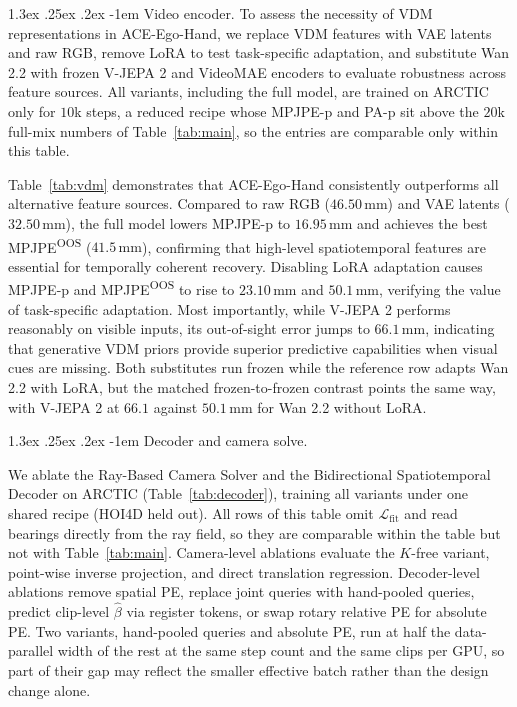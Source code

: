 \documentclass[10pt,twocolumn,letterpaper]{article}
\makeatletter
\renewcommand\paragraph{\@startsection{paragraph}{4}{\z@}%
  {1.3ex \@plus .25ex \@minus .2ex}%
  {-1em}%
  {\normalfont\normalsize\bfseries}}
\newcommand{\method}{ACE-Ego-Hand} %
\makeatother
\begin{document}
\paragraph{Video encoder.}
To assess the necessity of VDM representations in \method{}, we replace VDM features with VAE latents and raw RGB, remove LoRA to test task-specific adaptation, and substitute Wan 2.2 with frozen V-JEPA 2 and VideoMAE encoders to evaluate robustness across feature sources. All variants, including the full model, are trained on ARCTIC only for $10$k steps, a reduced recipe whose MPJPE-p and PA-p sit above the $20$k full-mix numbers of Table~\ref{tab:main}, so the entries are comparable only within this table.

Table~\ref{tab:vdm} demonstrates that \method{} consistently outperforms all alternative feature sources. Compared to raw RGB ($46.50\,\mathrm{mm}$) and VAE latents ($32.50\,\mathrm{mm}$), the full model lowers MPJPE-p to $16.95\,\mathrm{mm}$ and achieves the best MPJPE\textsuperscript{OOS} ($41.5\,\mathrm{mm}$), confirming that high-level spatiotemporal features are essential for temporally coherent recovery. Disabling LoRA adaptation causes MPJPE-p and MPJPE\textsuperscript{OOS} to rise to $23.10\,\mathrm{mm}$ and $50.1\,\mathrm{mm}$, verifying the value of task-specific adaptation. Most importantly, while V-JEPA 2 performs reasonably on visible inputs, its out-of-sight error jumps to $66.1\,\mathrm{mm}$, indicating that generative VDM priors provide superior predictive capabilities when visual cues are missing. Both substitutes run frozen while the reference row adapts Wan 2.2 with LoRA, but the matched frozen-to-frozen contrast points the same way, with V-JEPA 2 at $66.1$ against $50.1\,\mathrm{mm}$ for Wan 2.2 without LoRA.


\paragraph{Decoder and camera solve.}

We ablate the Ray-Based Camera Solver and the Bidirectional Spatiotemporal Decoder on ARCTIC (Table~\ref{tab:decoder}), training all variants under one shared recipe (HOI4D held out). All rows of this table omit $\mathcal{L}_{\mathrm{fit}}$ and read bearings directly from the ray field, so they are comparable within the table but not with Table~\ref{tab:main}. Camera-level ablations evaluate the $K$-free variant, point-wise inverse projection, and direct translation regression. Decoder-level ablations remove spatial PE, replace joint queries with hand-pooled queries, predict clip-level $\hat{\beta}$ via register tokens, or swap rotary relative PE for absolute PE. Two variants, hand-pooled queries and absolute PE, run at half the data-parallel width of the rest at the same step count and the same clips per GPU, so part of their gap may reflect the smaller effective batch rather than the design change alone.
\end{document}
